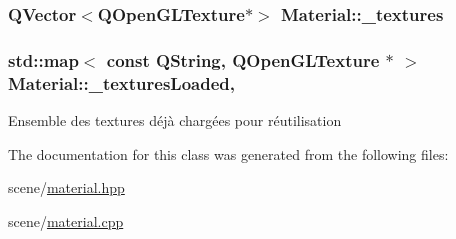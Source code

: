 \hypertarget{class_material_a0cccab80c654d9506bd1fff36ee47bd6}{
\subsubsection[{\+\_\+textures}]{\setlength{\rightskip}{0pt plus 5cm}Q\+Vector$<$Q\+Open\+G\+L\+Texture$\ast$$>$ Material\+::\+\_\+textures\hspace{0.3cm}{\ttfamily [private]}}}\label{class_material_a0cccab80c654d9506bd1fff36ee47bd6}
\hypertarget{class_material_a9ccbb6b22b224284050b4d6c172829fc}{
\subsubsection[{\+\_\+textures\+Loaded}]{\setlength{\rightskip}{0pt plus 5cm}std\+::map$<$ const Q\+String, Q\+Open\+G\+L\+Texture $\ast$ $>$ Material\+::\+\_\+textures\+Loaded\hspace{0.3cm}{\ttfamily [static]}, {\ttfamily [private]}}}\label{class_material_a9ccbb6b22b224284050b4d6c172829fc}
Ensemble des textures déjà chargées pour réutilisation 

The documentation for this class was generated from the following files\+:\begin{DoxyCompactItemize}
\item 
scene/\hyperlink{material_8hpp}{material.\+hpp}\item 
scene/\hyperlink{material_8cpp}{material.\+cpp}\end{DoxyCompactItemize}

